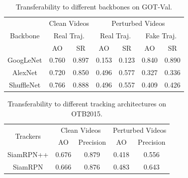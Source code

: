 \documentclass[journal]{IEEEtran}
\begin{document}
\begin{table}[t]
  \centering
  \caption{Transferability to different backbones on GOT-Val.}
  \begin{tabular}{c|cc|cc|cc} 
  \toprule
  \multirow{3}{*}[-6pt]{Backbone} & \multicolumn{2}{c|}{Clean Videos}    & \multicolumn{4}{c}{Perturbed Videos}                                        \\ 
  \cmidrule{2-7}
                            & \multicolumn{2}{c|}{Real Traj.} & \multicolumn{2}{c|}{Real Traj.} & \multicolumn{2}{c}{Fake Traj.}  \\ 
  \cmidrule{2-7}
                            & AO    & SR                           & AO    & SR                           & AO    & SR                           \\ 
  \midrule
  GoogLeNet                 & 0.760 & 0.897                        & 0.153 & 0.123                        & 0.840 & 0.890                        \\
  AlexNet                   & 0.720 & 0.850                        & 0.496 & 0.577                        & 0.327 & 0.336                        \\
  ShuffleNet                & 0.766 & 0.888                        & 0.496 & 0.557                        & 0.409 & 0.426                       \\
  \bottomrule
  \end{tabular}
  \label{tab:backbone}
\end{table}
\begin{table}[t!]
  \centering
  \caption{Transferability to different tracking architectures on OTB2015.}
  \begin{tabular}{c|cc|cc} 
  \toprule
  \multirow{2}{*}[-2pt]{Trackers} & \multicolumn{2}{c|}{Clean Videos} & \multicolumn{2}{c}{Perturbed Videos}  \\
  \cmidrule{2-5}
                            & AO & Precision              & AO & Precision                   \\
  \midrule
  SiamRPN++                 & 0.676   & 0.879                  & 0.418   & 0.556                       \\
  SiamRPN                   & 0.666   & 0.876                  & 0.483   & 0.643                       \\
  \bottomrule
  \end{tabular}
  \label{tab:arch}
\end{table}
\end{document}
